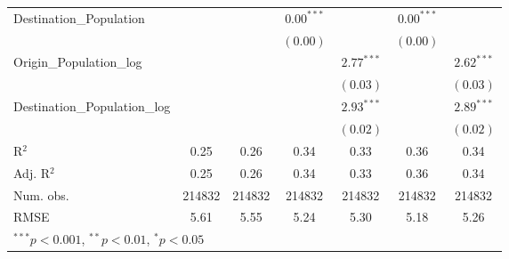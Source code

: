 \begin{table}
\begin{center}
\begin{tabular}{l c c c c c c }
			Destination\_Population      &               &               & $0.00^{***}$  &                & $0.00^{***}$  &                \\
			&               &               & $(0.00)$      &                & $(0.00)$      &                \\
			Origin\_Population\_log      &               &               &               & $2.77^{***}$   &               & $2.62^{***}$   \\
			&               &               &               & $(0.03)$       &               & $(0.03)$       \\
			Destination\_Population\_log &               &               &               & $2.93^{***}$   &               & $2.89^{***}$   \\
			&               &               &               & $(0.02)$       &               & $(0.02)$       \\
			\hline
			R$^2$                        & 0.25          & 0.26          & 0.34          & 0.33           & 0.36          & 0.34           \\
			Adj. R$^2$                   & 0.25          & 0.26          & 0.34          & 0.33           & 0.36          & 0.34           \\
			Num. obs.                    & 214832        & 214832        & 214832        & 214832         & 214832        & 214832         \\
			RMSE                         & 5.61          & 5.55          & 5.24          & 5.30           & 5.18          & 5.26           \\
			\hline
			\multicolumn{7}{l}{\scriptsize{$^{***}p<0.001$, $^{**}p<0.01$, $^*p<0.05$}}
		\end{tabular}
		\label{table:GravityModel2016Q4}
	\end{center}
\end{table}

